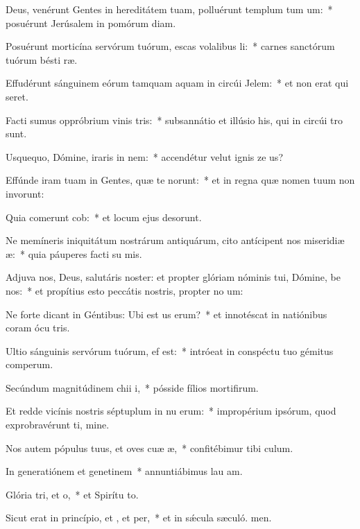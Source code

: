 \item Deus, venérunt Gentes in hereditátem tuam, polluérunt templum tum um:~* posuérunt Jerúsalem in pomórum diam.
\item Posuérunt morticína servórum tuórum, escas volalibus li:~* carnes sanctórum tuórum bésti ræ.
\item Effudérunt sánguinem eórum tamquam aquam in circúi Jelem:~* et non erat qui seret.
\item Facti sumus oppróbrium vinis tris:~* subsannátio et illúsio his, qui in circúi tro sunt.
\item Usquequo, Dómine, iraris in nem:~* accendétur velut ignis ze us?
\item Effúnde iram tuam in Gentes, quæ te  norunt:~* et in regna quæ nomen tuum non invorunt:
\item Quia comerunt cob:~* et locum ejus desorunt.
\item Ne memíneris iniquitátum nostrárum antiquárum, cito antícipent nos miseridiæ æ:~* quia páuperes facti su mis.
\item Adjuva nos, Deus, salutáris noster: et propter glóriam nóminis tui, Dómine, be nos:~* et propítius esto peccátis nostris, propter no um:
\item Ne forte dicant in Géntibus: Ubi est us erum?~* et innotéscat in natiónibus coram ócu tris.
\item Ultio sánguinis servórum tuórum,  ef est:~* intróeat in conspéctu tuo gémitus comperum.
\item Secúndum magnitúdinem chii i,~* pósside fílios mortifirum.
\item Et redde vicínis nostris séptuplum in nu erum:~* impropérium ipsórum, quod exprobravérunt ti, mine.
\item Nos autem pópulus tuus, et oves cuæ æ,~* confitébimur tibi  culum.
\item In generatiónem et genetinem~* annuntiábimus lau am.
\item Glória tri, et o,~* et Spirítu to.
\item Sicut erat in princípio, et , et per,~* et in sǽcula sæculó. men.
